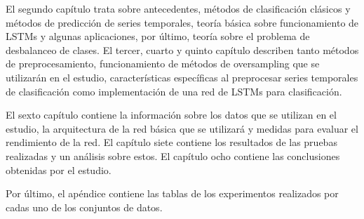El segundo capítulo trata sobre antecedentes, métodos de clasificación clásicos y métodos de predicción de series temporales, teoría básica sobre funcionamiento de LSTMs y algunas aplicaciones, por último, teoría sobre el problema de desbalanceo de clases.\newline
\newpage
El tercer, cuarto y quinto capítulo describen tanto métodos de preprocesamiento, funcionamiento de métodos de oversampling que se utilizarán en el estudio, características específicas al preprocesar series temporales de clasificación  como implementación de una red de LSTMs para clasificación.\newline

El sexto capítulo contiene la información sobre los datos que se utilizan en el estudio, la arquitectura de la red básica que se utilizará y medidas para evaluar el rendimiento de la red. El capítulo siete contiene los resultados de las pruebas realizadas y un análisis sobre estos. El capítulo ocho contiene las conclusiones obtenidas por el estudio.\newline

Por último, el apéndice contiene las tablas de los experimentos realizados por cadas uno de los conjuntos de datos.